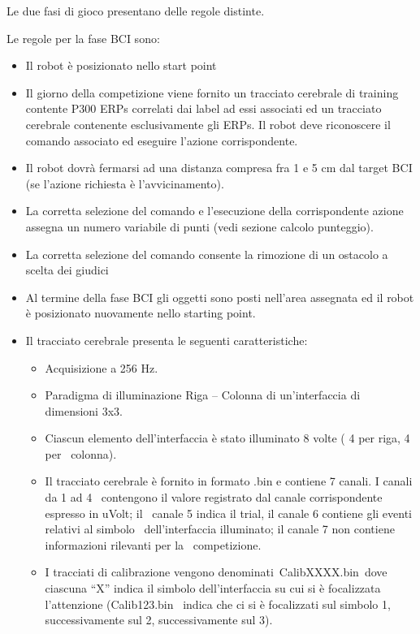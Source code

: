 \documentclass[a4paper,12pt,italian]{article}
\begin{document}
Le due fasi di gioco presentano delle regole distinte.

Le regole per la fase BCI sono:
\begin{itemize}
	\item Il robot è posizionato nello start point
	\item Il giorno della competizione viene fornito un tracciato cerebrale di training contente P300 ERPs correlati dai label ad essi associati ed un tracciato cerebrale contenente esclusivamente gli ERPs. Il robot deve riconoscere il comando associato ed eseguire l’azione corrispondente.
	\item Il robot dovrà fermarsi ad una distanza compresa fra 1 e 5 cm dal target BCI (se l’azione richiesta è l’avvicinamento).
	\item La corretta selezione del comando e l’esecuzione della corrispondente azione assegna un numero variabile di punti (vedi sezione calcolo punteggio).
	\item La corretta selezione del comando consente la rimozione di un ostacolo a scelta dei giudici
	\item Al termine della fase BCI gli oggetti sono posti nell’area assegnata ed il robot è posizionato nuovamente nello starting point.
	\item Il tracciato cerebrale presenta le seguenti caratteristiche:
		\begin{itemize}
			\item Acquisizione a 256 Hz.
			\item Paradigma di illuminazione Riga – Colonna di un’interfaccia di dimensioni 3x3.
			\item Ciascun elemento dell’interfaccia è stato illuminato 8 volte ( 4 per riga, 4 per  colonna).
			\item Il tracciato cerebrale è fornito in formato .bin e contiene 7 canali. I canali da 1 ad 4  contengono il valore registrato dal canale corrispondente espresso in uVolt; il  canale 5 indica il trial, il canale 6 contiene gli eventi relativi al simbolo  dell’interfaccia illuminato; il canale 7 non contiene informazioni rilevanti per la  competizione.
			\item I tracciati di calibrazione vengono denominati CalibXXXX.bin dove ciascuna “X” indica il simbolo dell’interfaccia su cui si è focalizzata l’attenzione (Calib123.bin  indica che ci si è focalizzati sul simbolo 1, successivamente sul 2, successivamente sul 3).
		\end{itemize} 
\end{itemize}
\end{document}
